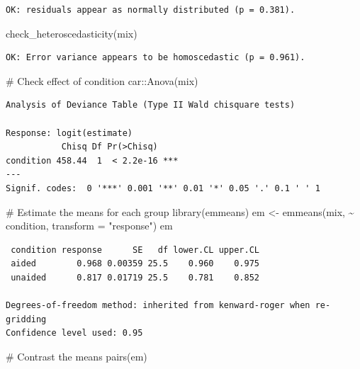 \documentclass[
  letterpaper,
]{book}
\newenvironment{Shaded}{\begin{snugshade}}{\end{snugshade}}
\newcommand{\AttributeTok}[1]{\textcolor[rgb]{0.40,0.45,0.13}{#1}}
\newcommand{\CommentTok}[1]{\textcolor[rgb]{0.37,0.37,0.37}{#1}}
\newcommand{\FunctionTok}[1]{\textcolor[rgb]{0.28,0.35,0.67}{#1}}
\newcommand{\NormalTok}[1]{\textcolor[rgb]{0.00,0.23,0.31}{#1}}
\newcommand{\OtherTok}[1]{\textcolor[rgb]{0.00,0.23,0.31}{#1}}
\newcommand{\SpecialCharTok}[1]{\textcolor[rgb]{0.37,0.37,0.37}{#1}}
\newcommand{\StringTok}[1]{\textcolor[rgb]{0.13,0.47,0.30}{#1}}
\begin{document}
\begin{verbatim}
OK: residuals appear as normally distributed (p = 0.381).
\end{verbatim}

\begin{Shaded}
\begin{Highlighting}[]
\FunctionTok{check\_heteroscedasticity}\NormalTok{(mix)}
\end{Highlighting}
\end{Shaded}

\begin{verbatim}
OK: Error variance appears to be homoscedastic (p = 0.961).
\end{verbatim}

\begin{Shaded}
\begin{Highlighting}[]
\CommentTok{\# Check effect of condition}
\NormalTok{car}\SpecialCharTok{::}\FunctionTok{Anova}\NormalTok{(mix)}
\end{Highlighting}
\end{Shaded}

\begin{verbatim}
Analysis of Deviance Table (Type II Wald chisquare tests)

Response: logit(estimate)
           Chisq Df Pr(>Chisq)    
condition 458.44  1  < 2.2e-16 ***
---
Signif. codes:  0 '***' 0.001 '**' 0.01 '*' 0.05 '.' 0.1 ' ' 1
\end{verbatim}

\begin{Shaded}
\begin{Highlighting}[]
\CommentTok{\# Estimate the means for each group}
\FunctionTok{library}\NormalTok{(emmeans)}
\NormalTok{em }\OtherTok{\textless{}{-}} \FunctionTok{emmeans}\NormalTok{(mix, }\SpecialCharTok{\textasciitilde{}}\NormalTok{ condition, }\AttributeTok{transform =} \StringTok{"response"}\NormalTok{)}
\NormalTok{em}
\end{Highlighting}
\end{Shaded}

\begin{verbatim}
 condition response      SE   df lower.CL upper.CL
 aided        0.968 0.00359 25.5    0.960    0.975
 unaided      0.817 0.01719 25.5    0.781    0.852

Degrees-of-freedom method: inherited from kenward-roger when re-gridding 
Confidence level used: 0.95 
\end{verbatim}

\begin{Shaded}
\begin{Highlighting}[]
\CommentTok{\# Contrast the means}
\FunctionTok{pairs}\NormalTok{(em)}
\end{Highlighting}
\end{Shaded}
\end{document}
